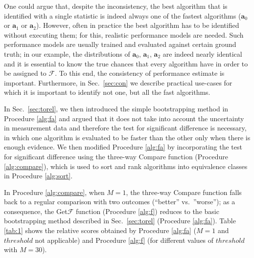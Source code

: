 \documentclass[conference]{IEEEtran}
\newcommand{\p}[1]{{\color{blue} Pdj: #1}}
\begin{document}
One could argue that, despite the inconsistency, the best algorithm that is identified with a single statistic is indeed
always one of the fastest algorithms ($\mathbf{a}_0$ or $\mathbf{a}_1$ or $\mathbf{a}_2$). However, often in practice the
best algorithm has  to be identified without executing them; for this, realistic performance models are needed. Such
performance models are usually trained and evaluated against certain ground truth; in our example, the distributions of
$\mathbf{a}_0$, $\mathbf{a}_1$, $\mathbf{a}_2$ are indeed nearly identical and it is essential to know the true chances
that every algorithm have in order to be assigned to $\mathcal{F}$. To this end, the consistency of performance estimate
is important. Furthermore,
in Sec.~\ref{sec:con} we describe
practical use-cases for which it is important to identify not one, but all the fast algorithms.
 
In Sec.~\ref{sec:torel}, we then introduced the simple bootstrapping method in Procedure \ref{alg:fa} and argued that it does not take into account the uncertainty in measurement data and therefore the test for significant difference is necessary, in which one algorithm is evaluated to be faster than the other only when there is enough evidence. We then modified Procedure \ref{alg:fa} by incorporating the test for significant difference using the three-way Compare function (Procedure \ref{alg:compare}), which is used to sort and rank algorithms into equivalence classes in Procedure \ref{alg:sort}. 
 
In Procedure \ref{alg:compare}, when $M = 1$, the three-way Compare function falls back to a regular comparison with
two outcomes (``better'' vs.~''worse''); as a consequence, the Get$\mathcal{F}$ function (Procedure \ref{alg:f}) reduces to the basic bootstrapping method
described in Sec.~\ref{sec:torel} (Procedure \ref{alg:fa}).
Table \ref{tab:1} shows the relative scores obtained by Procedure \ref{alg:fa} ($M=1$  and $threshold$ not applicable) and Procedure
\ref{alg:f} (for different values of $threshold$ with $M=30$).
\end{document}
